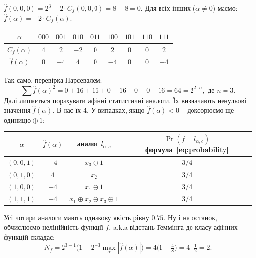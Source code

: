 $\hat{f}(0,0,0) = 2^3 - 2 \cdot C_f(0,0,0) = 8 - 8 = 0$. Для всіх інших ($\alpha \neq 0$) маємо:
$\hat{f}(\alpha) = -2 \cdot C_f(\alpha)$.
\begin{center}
    \renewcommand{\arraystretch}{1.2}
    \begin{tabular}{c|cccccccc}
        $\alpha$          & $000$ & $001$ & $010$ & $011$ & $100$ & $101$ & $110$ & $111$ \\
        \hline
        $C_f(\alpha)$     & $4$   & $2$   & $-2$  & $0$   & $2$   & $0$   & $0$   & $2$   \\
        $\hat{f}(\alpha)$ & $0$   & $-4$  & $4$   & $0$   & $-4$  & $0$   & $0$   & $-4$
    \end{tabular}
\end{center}
Так само, перевірка Парсевалем:
\begin{equation*}
    \sum \hat{f}(\alpha)^2 = 0 + 16 + 16 + 0 + 16 + 0 + 0 + 16 = 64 = 2^{2 \cdot n}, \text{ де } n=3.
\end{equation*}
Далі лишається порахувати афінні статистичні аналоги. Їх визначають ненульові значення $\hat{f}(\alpha)$. В нас їх 4.
У випадках, якщо $\hat{f}(\alpha) < 0$ -- доксорюємо ще одиницю $\oplus\, 1$:

\begin{center}
    \renewcommand{\arraystretch}{1.3}
    \begin{tabular}{c|c|c|c}
        $\alpha$  & $\hat{f}(\alpha)$ & аналог $l_{\alpha,c}$                & $\Pr(f = l_{\alpha,c})$ формула~\eqref{eq:probability} \\
        \hline
        $(0,0,1)$ & $-4$              & $x_3 \oplus 1$                       & 3/4                                                    \\
        $(0,1,0)$ & $4$               & $x_2$                                & 3/4                                                    \\
        $(1,0,0)$ & $-4$              & $x_1 \oplus 1$                       & 3/4                                                    \\
        $(1,1,1)$ & $-4$              & $x_1 \oplus x_2 \oplus x_3 \oplus 1$ & 3/4                                                    \\
    \end{tabular}
\end{center}
Усі чотири аналоги мають однакову якість рівну $0.75$. Ну і на останок, обчислюємо нелінійність функції $f$,
a.k.a відстань Геммінга до класу афінних функцій складає:
\begin{equation*}
    N_f = 2^{3-1}\big(1 - 2^{-3}\max_\alpha |\hat{f}(\alpha)|\big) = 4\big(1 - \tfrac{4}{8}\big) = 4 \cdot \tfrac{1}{2} = 2.
\end{equation*}

